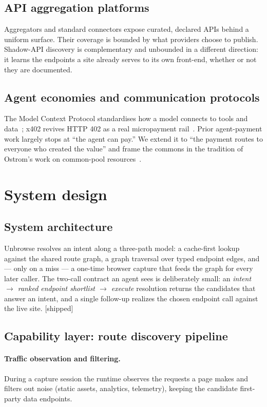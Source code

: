 \documentclass[11pt]{article}
\newcommand{\impl}{\textcolor{green!55!black}{\small[shipped]}}
\begin{document}
\subsection{API aggregation platforms}
Aggregators and standard connectors expose curated, declared APIs behind a uniform
surface. Their coverage is bounded by what providers choose to publish. Shadow-API
discovery is complementary and unbounded in a different direction: it learns the
endpoints a site already serves to its own front-end, whether or not they are
documented.

\subsection{Agent economies and communication protocols}
The Model Context Protocol standardises how a model connects to tools and
data~\cite{mcp}; x402 revives HTTP 402 as a real micropayment
rail~\cite{x402}. Prior agent-payment work largely stops at ``the agent can pay.''
We extend it to ``the payment routes to everyone who created the value'' and frame
the commons in the tradition of Ostrom's work on common-pool
resources~\cite{ostrom}.

\section{System design}
\subsection{System architecture}
Unbrowse resolves an intent along a three-path model: a cache-first lookup against
the shared route graph, a graph traversal over typed endpoint edges, and --- only
on a miss --- a one-time browser capture that feeds the graph for every later
caller. The two-call contract an agent sees is deliberately small: an \emph{intent
$\to$ ranked endpoint shortlist $\to$ execute} resolution returns the candidates
that answer an intent, and a single follow-up realizes the chosen endpoint call
against the live site. \impl

\subsection{Capability layer: route discovery pipeline}
\paragraph{Traffic observation and filtering.} During a capture session the runtime
observes the requests a page makes and filters out noise (static assets, analytics,
telemetry), keeping the candidate first-party data endpoints.
\end{document}
